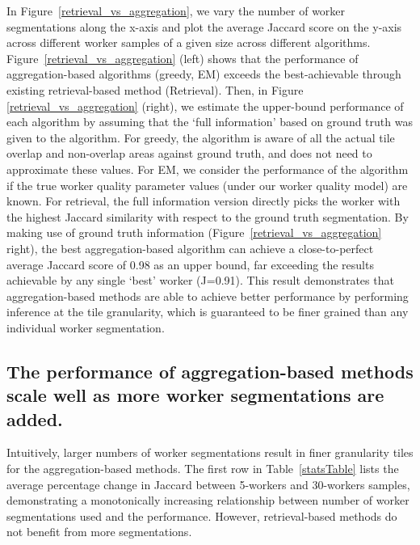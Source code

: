 \npar In Figure~\ref{retrieval_vs_aggregation}, we vary the number of worker segmentations along the x-axis and plot the average Jaccard score on the y-axis across different worker samples of a given size across different algorithms. Figure~\ref{retrieval_vs_aggregation} (left) shows that the performance of aggregation-based algorithms (greedy, EM) exceeds the best-achievable through existing retrieval-based method (Retrieval). Then, in Figure \ref{retrieval_vs_aggregation} (right), we estimate the upper-bound performance of each algorithm by assuming that the `full information' based on ground truth was given to the algorithm. For greedy, the algorithm is aware of all the actual tile overlap and non-overlap areas against ground truth, and does not need to approximate these values. For EM, we consider the performance of the algorithm if the true worker quality parameter values (under our worker quality model) are known. For retrieval, the full information version directly picks the worker with the highest Jaccard similarity with respect to the ground truth segmentation. By making use of ground truth information (Figure~\ref{retrieval_vs_aggregation} right), the best aggregation-based algorithm can achieve a close-to-perfect average Jaccard score of 0.98 as an upper bound, far exceeding the results achievable by any single `best' worker (J=0.91). This result demonstrates that aggregation-based methods are able to achieve better performance by performing inference at the tile granularity, which is guaranteed to be finer grained than any individual worker segmentation. 

\subsection{The performance of aggregation-based methods scale well as more worker segmentations are added.}
\par \noindent Intuitively, larger numbers of worker segmentations result in finer granularity tiles for the aggregation-based methods. The first row in Table~\ref{statsTable} lists the average percentage change in Jaccard between 5-workers and 30-workers samples, demonstrating a monotonically increasing relationship between number of worker segmentations used and the performance. However, retrieval-based methods do not benefit from more segmentations.

